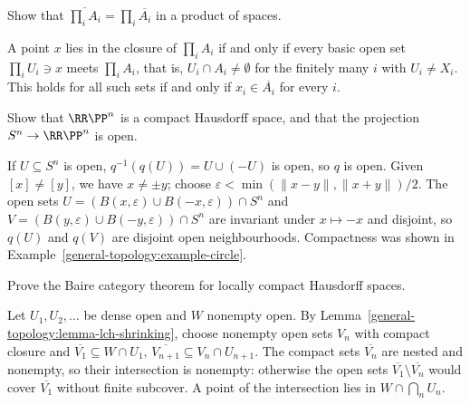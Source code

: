 \begin{exercise}\label{general-topology:exercise-closure-product}
Show that $\overline{\prod_i A_i} = \prod_i \overline{A_i}$ in a product of spaces.
\end{exercise}

\begin{solution}
A point $x$ lies in the closure of $\prod_i A_i$ if and only if every basic open set $\prod_i U_i \ni x$ meets $\prod_i A_i$, that is, $U_i \cap A_i \neq \emptyset$
for the finitely many $i$ with $U_i \neq X_i$. This holds for all such sets if and only if $x_i \in \overline{A_i}$ for every $i$.
\end{solution}

\begin{exercise}\label{general-topology:exercise-projective-hausdorff}
Show that $\RR\PP^n$ is a compact Hausdorff space, and that the projection $S^n \to \RR\PP^n$ is open.
\end{exercise}

\begin{solution}
If $U \subseteq S^n$ is open, $q^{-1}(q(U)) = U \cup (-U)$ is open, so $q$ is open. Given $[x] \neq [y]$, we have $x \neq \pm y$; choose
$\varepsilon < \min(\|x - y\|, \|x + y\|)/2$. The open sets $U = (B(x, \varepsilon) \cup B(-x, \varepsilon)) \cap S^n$ and
$V = (B(y, \varepsilon) \cup B(-y, \varepsilon)) \cap S^n$ are invariant under $x \mapsto -x$ and disjoint, so $q(U)$ and $q(V)$ are disjoint open
neighbourhoods. Compactness was shown in Example~\ref{general-topology:example-circle}.
\end{solution}

\begin{exercise}\label{general-topology:exercise-baire-lch}
Prove the Baire category theorem for locally compact Hausdorff spaces.
\end{exercise}

\begin{solution}
Let $U_1, U_2, \ldots$ be dense open and $W$ nonempty open. By Lemma~\ref{general-topology:lemma-lch-shrinking}, choose nonempty open sets $V_n$ with compact
closure and $\overline{V_1} \subseteq W \cap U_1$, $\overline{V_{n+1}} \subseteq V_n \cap U_{n+1}$. The compact sets $\overline{V_n}$ are nested and nonempty, so their
intersection is nonempty: otherwise the open sets $\overline{V_1} \setminus \overline{V_n}$ would cover $\overline{V_1}$ without finite subcover. A point of
the intersection lies in $W \cap \bigcap_n U_n$.
\end{solution}

